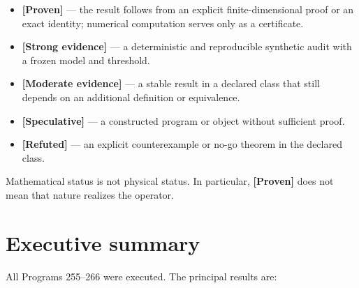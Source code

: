 \documentclass[11pt,a4paper,openany]{report}
\newcommand{\statusProven}{\textcolor{fingreen}{[Proven]}}
\newcommand{\statusStrong}{\textcolor{finblue}{[Strong evidence]}}
\newcommand{\statusModerate}{\textcolor{finviolet}{[Moderate evidence]}}
\newcommand{\statusSpeculative}{\textcolor{finorange}{[Speculative]}}
\newcommand{\statusRefuted}{\textcolor{finred}{[Refuted]}}
\begin{document}
\begin{itemize}
\item 
\textbf{\statusProven{}} --- the result follows from an explicit finite-dimensional proof or an exact identity; numerical computation serves only as a certificate.

\item 
\textbf{\statusStrong{}} --- a deterministic and reproducible synthetic audit with a frozen model and threshold.

\item 
\textbf{\statusModerate{}} --- a stable result in a declared class that still depends on an additional definition or equivalence.

\item 
\textbf{\statusSpeculative{}} --- a constructed program or object without sufficient proof.

\item 
\textbf{\statusRefuted{}} --- an explicit counterexample or no-go theorem in the declared class.

\end{itemize}

Mathematical status is not physical status. In particular, \textbf{\statusProven{}} does not mean that nature realizes the operator.

\chapter{Executive summary}

All Programs 255--266 were executed. The principal results are:
\end{document}
